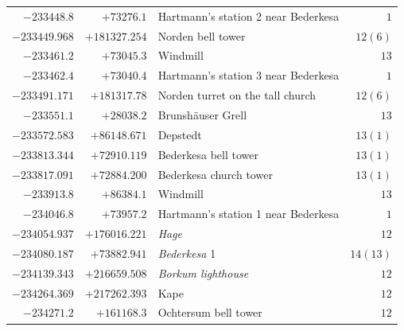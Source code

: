 \begin{center}
\begin{tabular}{r|r|p{170pt}|r}
\(-233448.8\)&\(+73276.1\)&Hartmann’s station 2 near Bederkesa&\(1\)\\
\(-233449.968\)&\(+181327.254\)&Norden bell tower&\(12(6)\)\\
\(-233461.2\)&\(+73045.3\)&Windmill&\(13\)\\
\(-233462.4\)&\(+73040.4\)&Hartmann’s station 3 near Bederkesa&\(1\)\\
\(-233491.171\)&\(+181317.78\)&Norden turret on the tall church&\(12(6)\)\\
\(-233551.1\)&\(+28038.2\)&Brunshäuser Grell&\(13\)\\
\(-233572.583\)&\(+86148.671\)&Depstedt&\(13(1)\)\\
\(-233813.344\)&\(+72910.119\)&Bederkesa bell tower&\(13(1)\)\\
\(-233817.091\)&\(+72884.200\)&Bederkesa church tower&\(13(1)\)\\
\(-233913.8\)&\(+86384.1\)&Windmill&\(13\)\\
\(-234046.8\)&\(+73957.2\)&Hartmann’s station 1 near Bederkesa&\(1\)\\
\(-234054.937\)&\(+176016.221\)&\textit{Hage}&\(12\)\\
\(-234080.187\)&\(+73882.941\)&\textit{Bederkesa} 1&\(14(13)\)\\
\(-234139.343\)&\(+216659.508\)&\textit{Borkum lighthouse}&\(12\)\\
\(-234264.369\)&\(+217262.393\)&Kape&\(12\)\\
\(-234271.2\)&\(+161168.3\)&Ochtersum bell tower&\(12\)\\
\hline\end{tabular}\endgroup\end{center}
\clearpage
